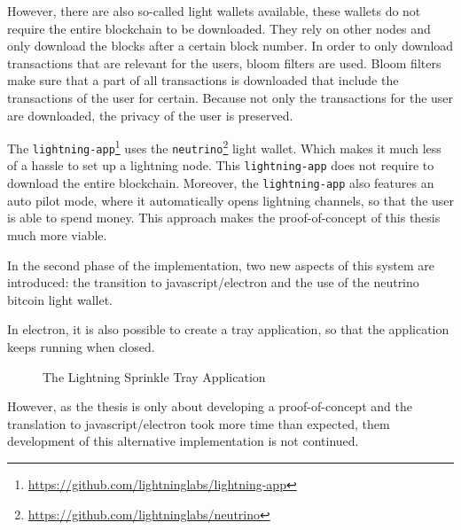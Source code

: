 However, there are also so-called light wallets available, these wallets do not require the entire blockchain to be downloaded. They rely on other nodes and only download the blocks after a certain block number. In order to only download transactions that are relevant for the users, bloom filters are used. Bloom filters make sure that a part of all transactions is downloaded that include the transactions of the user for certain. Because not only the transactions for the user are downloaded, the privacy of the user is preserved. 

The \texttt{lightning-app}\footnote{\url{https://github.com/lightninglabs/lightning-app}} uses the \texttt{neutrino}\footnote{\url{https://github.com/lightninglabs/neutrino}} light wallet. Which makes it much less of a hassle to set up a lightning node. This \texttt{lightning-app} does not require to download the entire blockchain. Moreover, the \texttt{lightning-app} also features an auto pilot mode, where it automatically opens lightning channels, so that the user is able to spend money. This approach makes the proof-of-concept of this thesis much more viable. 

In the second phase of the implementation, two new aspects of this system are introduced: the transition to javascript/electron and the use of the neutrino bitcoin light wallet.

In electron, it is also possible to create a tray application, so that the application keeps running when closed. 


\begin{figure}[h!]
  \setlength{\fboxsep}{0pt}%
  \center
  \caption{The Lightning Sprinkle Tray Application}
\end{figure}

However, as the thesis is only about developing a proof-of-concept and the translation to javascript/electron took more time than expected, them development of this alternative implementation is not continued.

